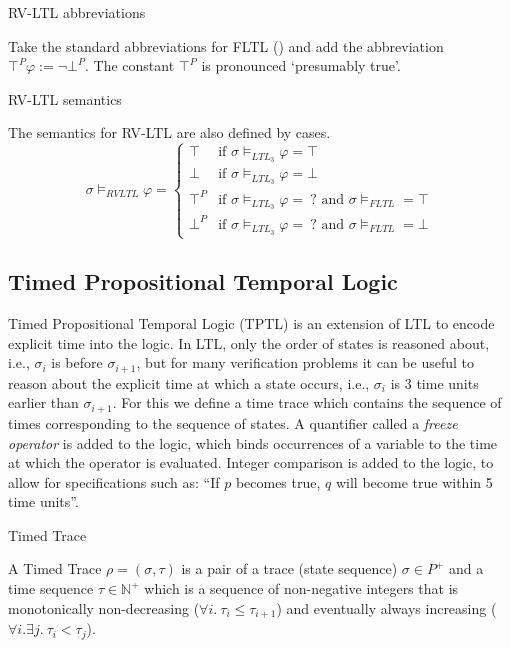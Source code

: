\documentclass[a4paper]{article}
\newcommand{\tand}{\text{ and }}
\begin{document}
\begin{notn}{RV-LTL abbreviations}

  Take the standard abbreviations for FLTL () and add the abbreviation $\top^P \varphi:= \neg \bot^P$. The constant $\top^P$ is pronounced `presumably true'.
\end{notn}

\begin{defn}{RV-LTL semantics}

  The semantics for RV-LTL are also defined by cases.
  \[\sigma\vDash_{RVLTL}\varphi =
    \begin{cases}
      \top & \text{if } \sigma \vDash_{LTL_3} \varphi = \top\\
      \bot & \text{if } \sigma \vDash_{LTL_3} \varphi = \bot\\
      \top^P & \text{if } \sigma \vDash_{LTL_3} \varphi = ~?\tand \sigma\vDash_{FLTL} = \top \\
      \bot^P & \text{if } \sigma \vDash_{LTL_3} \varphi = ~?\tand \sigma\vDash_{FLTL} = \bot
    \end{cases}
  \]
\end{defn}


\subsection{Timed Propositional Temporal Logic}
Timed Propositional Temporal Logic (TPTL)\autocite{alur1994really} is an extension of LTL to encode explicit time into the logic.
In LTL, only the order of states is reasoned about, i.e., $\sigma_i$ is before $\sigma_{i+1}$, but for many verification problems it can be useful to reason about the explicit time at which a state occurs, i.e., $\sigma_i$ is 3 time units earlier than $\sigma_{i+1}$.
For this we define a time trace which contains the sequence of times corresponding to the sequence of states.
A quantifier called a \emph{freeze operator} is added to the logic, which binds occurrences of a variable to the time at which the operator is evaluated.
Integer comparison is added to the logic, to allow for specifications such as: ``If $p$ becomes true, $q$ will become true within 5 time units''.



\begin{defn}{Timed Trace}

  A Timed Trace $\rho = (\sigma,\tau)$ is a pair of a trace (state sequence) $\sigma \in P^+$ and a time sequence $\tau \in \mathbb{N}^+$ which is a sequence of non-negative integers that is monotonically non-decreasing ($\forall i. ~\tau_i \leq \tau_{i+1}$) and eventually always increasing ($\forall i. \exists j. ~\tau_i < \tau_j$).
\end{defn}
\end{document}
